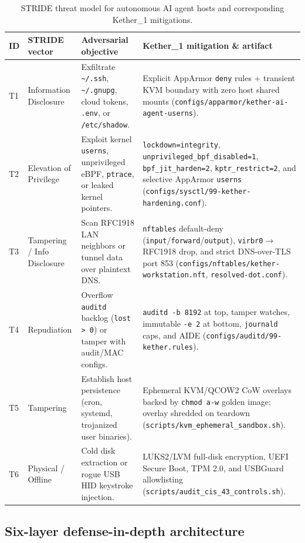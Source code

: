 \documentclass[11pt,a4paper]{article}
\newcommand{\code}[1]{\nolinkurl{#1}}
\begin{document}
\begin{table}[htbp]
\centering
\caption{STRIDE threat model for autonomous AI agent hosts and corresponding Kether\_1 mitigations.}
\label{tab:threats}
\footnotesize
\renewcommand{\arraystretch}{1.2}
\begin{tabularx}{\textwidth}{@{}l p{2.7cm} L L@{}}
\toprule
\textbf{ID} & \textbf{STRIDE vector} & \textbf{Adversarial objective} & \textbf{Kether\_1 mitigation \& artifact} \\
\midrule
T1 & Information Disclosure & Exfiltrate \code{~/.ssh}, \code{~/.gnupg}, cloud tokens, \code{.env}, or \code{/etc/shadow}. & Explicit AppArmor \code{deny} rules + transient KVM boundary with zero host shared mounts (\code{configs/apparmor/kether-ai-agent-userns}). \\
T2 & Elevation of Privilege & Exploit kernel \code{userns}, unprivileged eBPF, \code{ptrace}, or leaked kernel pointers. & \code{lockdown=integrity}, \code{unprivileged_bpf_disabled=1}, \code{bpf_jit_harden=2}, \code{kptr_restrict=2}, and selective AppArmor \code{userns} (\code{configs/sysctl/99-kether-hardening.conf}). \\
T3 & Tampering / Info Disclosure & Scan RFC1918 LAN neighbors or tunnel data over plaintext DNS. & \code{nftables} default-deny (\code{input}/\code{forward}/\code{output}), \code{virbr0}$\rightarrow$RFC1918 drop, and strict DNS-over-TLS port 853 (\code{configs/nftables/kether-workstation.nft}, \code{resolved-dot.conf}). \\
T4 & Repudiation & Overflow \code{auditd} backlog (\code{lost > 0}) or tamper with audit/MAC configs. & \code{auditd -b 8192} at top, tamper watches, immutable \code{-e 2} at bottom, \code{journald} caps, and AIDE (\code{configs/auditd/99-kether.rules}). \\
T5 & Tampering & Establish host persistence (cron, systemd, trojanized user binaries). & Ephemeral KVM/QCOW2 CoW overlays backed by \code{chmod a-w} golden image; overlay shredded on teardown (\code{scripts/kvm_ephemeral_sandbox.sh}). \\
T6 & Physical / Offline & Cold disk extraction or rogue USB HID keystroke injection. & LUKS2/LVM full-disk encryption, UEFI Secure Boot, TPM 2.0, and USBGuard allowlisting (\code{scripts/audit_cis_43_controls.sh}). \\
\bottomrule
\end{tabularx}
\end{table}

\subsection{Six-layer defense-in-depth architecture}
\end{document}
